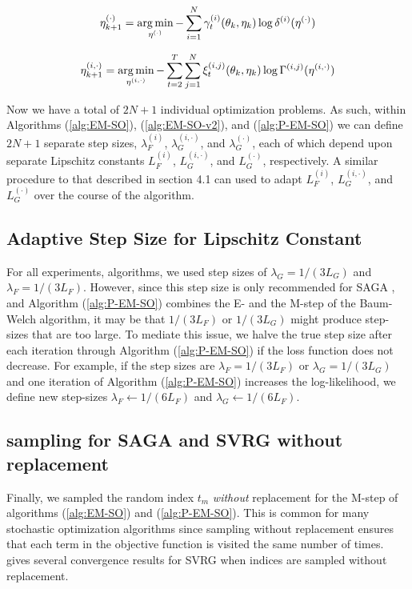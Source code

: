\begin{equation}
    \eta^{(\cdot)}_{k+1} = \operatorname*{arg\,min}_{\eta^{(\cdot)}} - \sum_{i=1}^N \gamma^{(i)}_t(\theta_{k},\eta_{k}) \log \delta^{(i)}(\eta^{(\cdot)})
    \label{eqn:min_G}
\end{equation}

\begin{equation}
    \eta^{(i,\cdot)}_{k+1} = \operatorname*{arg\,min}_{\eta^{(i,\cdot)}} - \sum_{t=2}^T \sum_{j=1}^N \xi^{(i,j)}_t(\theta_{k}, \eta_{k}) \log \Gamma^{(i,j)}(\eta^{(i,\cdot)})
    \label{eqn:min_G}
\end{equation}

Now we have a total of $2N + 1$ individual optimization problems. As such, within Algorithms (\ref{alg:EM-SO}), (\ref{alg:EM-SO-v2}), and (\ref{alg:P-EM-SO}) we can define $2N+1$ separate step sizes, $\lambda_F^{(i)}$, $\lambda_G^{(i,\cdot)}$, and $\lambda_G^{(\cdot)}$, each of which depend upon separate Lipschitz constants $L_F^{(i)}$, $L_G^{(i,\cdot)}$, and $L_G^{(\cdot)}$, respectively. A similar procedure to that described in section 4.1 can used to adapt $L_F^{(i)}$, $L_G^{(i,\cdot)}$, and $L_G^{(\cdot)}$ over the course of the algorithm.

\subsection{Adaptive Step Size for Lipschitz Constant}
\label{subsec:L_divider}

For all experiments, algorithms, we used step sizes of $\lambda_G = 1/(3L_G)$ and $\lambda_F = 1/(3L_F)$. However, since this step size is only recommended for SAGA \citep{Defazio:2014}, and Algorithm (\ref{alg:P-EM-SO}) combines the E- and the M-step of the Baum-Welch algorithm, it may be that $1/(3L_F)$ or $1/(3L_G)$ might produce step-sizes that are too large. To mediate this issue, we halve the true step size after each iteration through Algorithm (\ref{alg:P-EM-SO}) if the loss function does not decrease. For example, if the step sizes are $\lambda_F = 1/(3L_F)$ or $\lambda_G = 1/(3L_G)$ and one iteration of Algorithm (\ref{alg:P-EM-SO}) increases the log-likelihood, we define new step-sizes $\lambda_F \leftarrow 1/(6L_F)$ and $\lambda_G \leftarrow 1/(6L_F)$.

\subsection{sampling for SAGA and SVRG without replacement}
\label{subsec:wo_replacement}

Finally, we sampled the random index $t_m$ \textit{without} replacement for the M-step of algorithms (\ref{alg:EM-SO}) and (\ref{alg:P-EM-SO}). This is common for many stochastic optimization algorithms since sampling without replacement ensures that each term in the objective function is visited the same number of times. \citet{Ohad:2016} gives several convergence results for SVRG when indices are sampled without replacement.